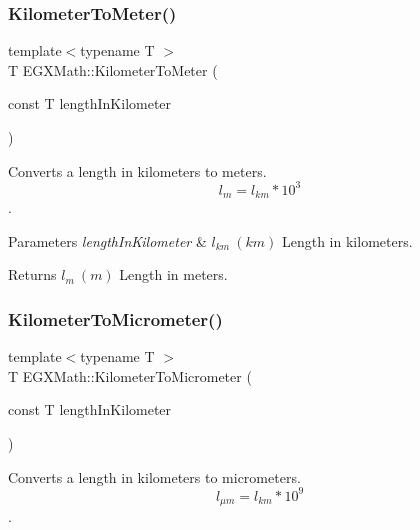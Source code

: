 \subsubsection{\texorpdfstring{Kilometer\+To\+Meter()}{KilometerToMeter()}}
{\footnotesize\ttfamily template$<$typename T $>$ \\
T E\+G\+X\+Math\+::\+Kilometer\+To\+Meter (\begin{DoxyParamCaption}\item[{const T}]{length\+In\+Kilometer }\end{DoxyParamCaption})}



Converts a length in kilometers to meters. \[ l_{m}=l_{km} * 10^{3} \]. 


\begin{DoxyParams}{Parameters}
{\em length\+In\+Kilometer} & $ l_{km}\ (km)$ Length in kilometers. \\
\hline
\end{DoxyParams}
\begin{DoxyReturn}{Returns}
$ l_{m}\ (m)$ Length in meters. 
\end{DoxyReturn}
\mbox{\label{group___e_g_x_math-_conversions-_length_conversions-_s_i-_kilometer-_s_i_ga345d16c72fcb96ff1dc3b7f290b94c94}} 
\subsubsection{\texorpdfstring{Kilometer\+To\+Micrometer()}{KilometerToMicrometer()}}
{\footnotesize\ttfamily template$<$typename T $>$ \\
T E\+G\+X\+Math\+::\+Kilometer\+To\+Micrometer (\begin{DoxyParamCaption}\item[{const T}]{length\+In\+Kilometer }\end{DoxyParamCaption})}



Converts a length in kilometers to micrometers. \[ l_{\mu m}=l_{km} * 10^{9} \]. 

